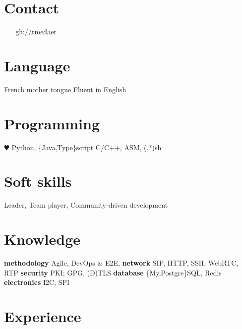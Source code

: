 \documentclass[]{friggeri-cv} %
\begin{document}


\begin{aside} %
\section{Contact}
\myAddress
~
\myPhoneNumber
~
\href{mailto:\myPrivateMail}{\ul{\myPrivateMail}}
\href{http://github.com/rmedaer}{\ul{gh://rmedaer}}
\section{Language}
French mother tongue
Fluent in English
\section{Programming}
{\color{red} $\varheartsuit$} Python, \{Java,Type\}script
C/C++, ASM, (.*)sh
\section{Soft skills}
Leader,
Team player,
Community-driven development
\section{Knowledge}
\textbf{methodology}
Agile, DevOps \& E2E,
\textbf{network}
SIP, HTTP, SSH, WebRTC, RTP
\textbf{security}
PKI; GPG, (D)TLS
\textbf{database}
\{My,Postgre\}SQL, Redis
\textbf{electronics}
I2C, SPI
\end{aside}


\section{Experience}
\end{document}
